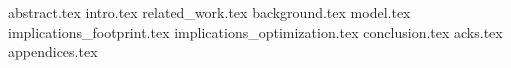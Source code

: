 
{abstract.tex}
{intro.tex}
{related_work.tex}
{background.tex}
{model.tex}
{implications_footprint.tex}
{implications_optimization.tex}
{conclusion.tex}
{acks.tex}
{appendices.tex}
